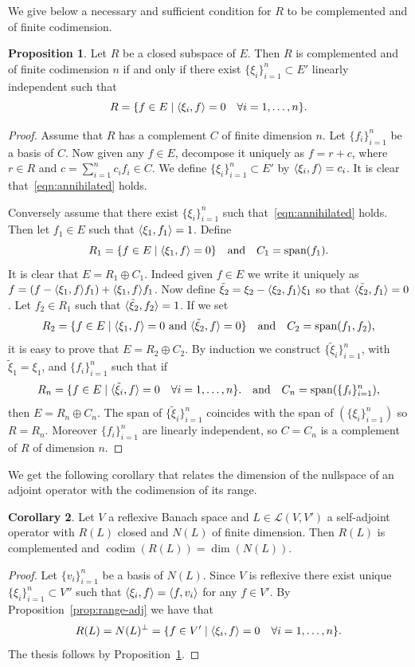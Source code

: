 \documentclass[a4paper,11pt]{article}
\theoremstyle{definition}
\newtheorem{prop}{Proposition}
\newtheorem{cor}[prop]{Corollary}
\DeclareMathOperator{\codim}{codim}
\DeclarePairedDelimiter{\dual}{\langle}{\rangle}
\begin{document}
We give below a necessary and sufficient condition for $R$ to be complemented and of finite codimension.
\begin{prop}
\label{prop:codim}
Let $R$ be a closed subspace of $E$. Then $R$ is complemented and of finite codimension $n$ if and only if there exist $\{\xi_i\}_{i=1}^n\subset E'$ linearly independent such that
\begin{equation}
\label{eqn:annihilated}
R=\{f\in E\;|\;\dual{\xi_i,f}=0\quad\forall i=1,\dots,n\}.
\end{equation}
\end{prop}
\begin{proof}
Assume that $R$ has a complement $C$ of finite dimension $n$. Let $\{f_i\}_{i=1}^n$ be a basis of $C$. Now given any $f\in E$, decompose it uniquely as $f=r+c$, where $r\in R$ and $c=\sum_{i=1}^{n}c_if_i\in C$. We define $\{\xi_i\}_{i=1}^n\subset E'$ by $\dual{\xi_i,f}=c_i$. It is clear that~\eqref{eqn:annihilated} holds.

Conversely assume that there exist $\{\xi_i\}_{i=1}^n$ such that~\eqref{eqn:annihilated} holds. Then let $f_1\in E$ such that $\dual{\xi_1,f_1}=1$. Define
\[
R_1=\{f\in E\;|\;\dual{\xi_1,f}=0\}\quad\text{and}\quad C_1=\text{span}(f_1).
\]
It is clear that $E=R_1\oplus C_1$. Indeed given $f\in E$ we write it uniquely as $f=(f-\dual{\xi_1,f}f_1)+\dual{\xi_1,f}f_1$. Now define $\tilde{\xi}_2=\xi_2-\dual{\xi_2,f_1}\xi_1$ so that $\dual{\tilde{\xi}_2,f_1}=0$. Let $f_2\in R_1$ such that $\dual{\tilde\xi_2,f_2}=1$. If we set
\[
R_2=\{f\in E\;|\;\text{$\dual{\xi_1,f}=0$ and $\dual{\tilde{\xi}_2,f}=0$}\}\quad\text{and}\quad C_2=\text{span}(f_1,f_2),
\]
it is easy to prove that $E=R_2\oplus C_2$. By induction we construct $\{\tilde\xi_i\}_{i=1}^n$, with $\tilde\xi_1=\xi_1$, and $\{f_i\}_{i=1}^n$ such that if
\[
R_n=\{f\in E\;|\;\dual{\tilde\xi_i,f}=0\quad\forall i=1,\dots,n\}.\quad\text{and}\quad C_n=\text{span}(\{f_i\}_{i=1}^n),
\]
then $E=R_n\oplus C_n$. The span of $\{\tilde\xi_i\}_{i=1}^n$ coincides with the span of $(\{\xi_i\}_{i=1}^n)$ so $R=R_n$. Moreover $\{f_i\}_{i=1}^n$ are linearly independent, so $C=C_n$ is a complement of $R$ of dimension $n$.
\end{proof}

We get the following corollary that relates the dimension of the nullspace of an adjoint operator with the codimension of its range.
\begin{cor}
Let $V$ a reflexive Banach space and $L\in\mathscr{L}(V,V')$ a self-adjoint operator with $R(L)$ closed and $N(L)$ of finite dimension. Then $R(L)$ is complemented and $\codim(R(L))=\dim(N(L))$.
\end{cor}
\begin{proof}
Let $\{v_i\}_{i=1}^n$ be a basis of $N(L)$. Since $V$ is reflexive there exist unique $\{\xi_i\}_{i=1}^n\subset V''$ such that $\dual{\xi_i,f}=\dual{f,v_i}$ for any $f\in V'$. By Proposition~\ref{prop:range-adj} we have that
\[
R(L)=N(L)^\perp=\{f\in V'\;|\;\dual{\xi_i,f}=0\quad\forall i=1,\dots,n\}.
\]
The thesis follows by Proposition~\ref{prop:codim}.
\end{proof}
\end{document}

